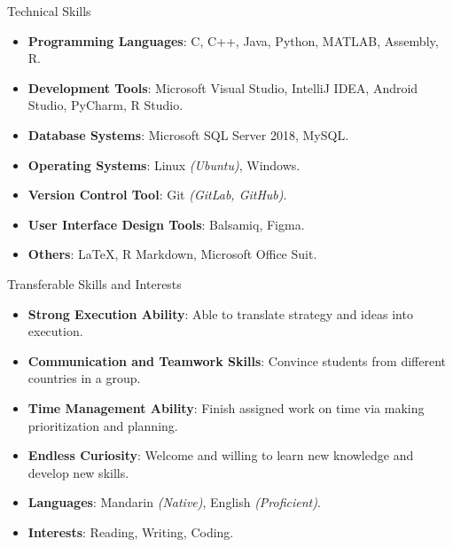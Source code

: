 \documentclass{resume} %
\begin{document}
\begin{rSection}{Technical Skills}
\begin{itemize}
    \item \textbf{Programming Languages}:  C, C++, Java, Python, MATLAB, Assembly, R.
    \vspace{-0.2cm}\item \textbf{Development Tools}:  Microsoft Visual Studio, IntelliJ IDEA, Android Studio, PyCharm, R Studio.
    \vspace{-0.2cm}\item \textbf{Database Systems}: Microsoft SQL Server 2018, MySQL.
    \vspace{-0.2cm}\item \textbf{Operating Systems}: Linux \textit{(Ubuntu)}, Windows.
    \vspace{-0.2cm}\item \textbf{Version Control Tool}: Git \textit{(GitLab, GitHub)}.
    \vspace{-0.2cm}\item \textbf{User Interface Design Tools}: Balsamiq, Figma.
    \vspace{-0.2cm}\item \textbf{Others}: \LaTeX, R Markdown, Microsoft Office Suit.
\end{itemize}
\end{rSection}

\begin{rSection}{Transferable Skills and Interests}
\begin{itemize}
    \item \textbf{Strong Execution Ability}: Able to translate strategy and ideas into execution.
    \vspace{-0.2cm}\item \textbf{Communication and Teamwork Skills}:  Convince students from different countries in a group.
    \vspace{-0.2cm}\item \textbf{Time Management Ability}: Finish assigned work on time via making prioritization and planning.
    \vspace{-0.2cm}\item \textbf{Endless Curiosity}: Welcome and willing to learn new knowledge and develop new skills.
    \vspace{-0.2cm}\item \textbf{Languages}: Mandarin \textit{(Native)}, English \textit{(Proficient)}.
    \vspace{-0.2cm}\item \textbf{Interests}: Reading, Writing, Coding.
\end{itemize}
\end{rSection}
\end{document}
